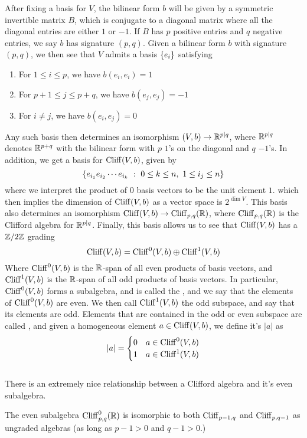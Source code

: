 After fixing a basis for $V$, the bilinear form $b$ will be given by a symmetric
invertible matrix $B$, which is conjugate to a diagonal matrix where all
the diagonal entries are either $1$ or $-1$. If $B$ has $p$ positive entries
and $q$ negative entries, we say $b$ has signature $(p,q)$. Given a bilinear
form $b$ with signature $(p,q)$, we then see that $V$ admits a basis
$\left\lbrace e_i \right\rbrace$ satisfying
%
\begin{enumerate}
  \item For $1 \leq i \leq p$, we have $b(e_i,e_i) = 1$
  \item For $p+1 \leq j \leq p+q$, we have $b(e_j,e_j) = -1$
  \item For $i \neq j$, we have $b(e_i,e_j) = 0$
\end{enumerate}
%
Any such basis then determines an isomorphism $(V,b) \to \mathbb{R}^{p|q}$, where
$\mathbb{R}^{p|q}$ denotes $\mathbb{R}^{p+q}$ with the bilinear form with $p$ $1$'s on the
diagonal and $q$ $-1$'s. In addition, we get a basis for
$\operatorname{Cliff}(V,b)$, given by
\[
\left\lbrace e_{i_1}e_{i_2}\cdots e_{i_k}~:~ 0 \leq k \leq n, ~ 1 \leq i_j \leq n \right\rbrace
\]
where we interpret the product of $0$ basis vectors to be the unit element $1$.
which then implies the dimension of $\operatorname{Cliff}(V,b)$ as a vector space is
$2^{\dim V}$. This basis also determines an isomorphism
$\operatorname{Cliff}(V,b) \to \operatorname{Cliff}_{p,q}(\mathbb{R})$, where $\operatorname{Cliff}_{p,q}(\mathbb{R})$ is the Clifford
algebra for $\mathbb{R}^{p|q}$. Finally, this basis allows us to see that $\operatorname{Cliff}(V,b)$
has a $\mathbb{Z}/2\mathbb{Z}$ grading
\[
\operatorname{Cliff}(V,b) = \operatorname{Cliff}^0(V,b) \oplus \operatorname{Cliff}^1(V,b)
\]
Where $\operatorname{Cliff}^0(V,b)$ is the $\mathbb{R}$-span of all even products of basis vectors,
and $\operatorname{Cliff}^1(V,b)$ is the $\mathbb{R}$-span of all odd products of basis vectors. In
particular, $\operatorname{Cliff}^0(V,b)$ forms a subalgebra, and is called the , and we say that the elements of $\operatorname{Cliff}^0(V,b)$ are even. We then
call $\operatorname{Cliff}^1(V,b)$ the odd subspace, and say that its elements are odd.
Elements that are contained in the odd or even subspace are called
, and given a homogeneous element $a \in \operatorname{Cliff}(V,b)$,
we define it's  $|a|$ as
\[
|a| = \begin{cases}
0 & a \in \operatorname{Cliff}^0(V,b) \\
1 & a \in \operatorname{Cliff}^1(V,b)
\end{cases}
\]\\
There is an extremely nice relationship between a Clifford algebra and it's
even subalgebra.
%
\begin{thm}
The even subalgebra $\operatorname{Cliff}_{p,q}^0(\mathbb{R})$ is isomorphic to both $\operatorname{Cliff}_{p-1,q}$
and $\operatorname{Cliff}_{p,q-1}$ as ungraded algebras (as long as $p-1 > 0$ and $q-1 > 0$.)
\end{thm}
